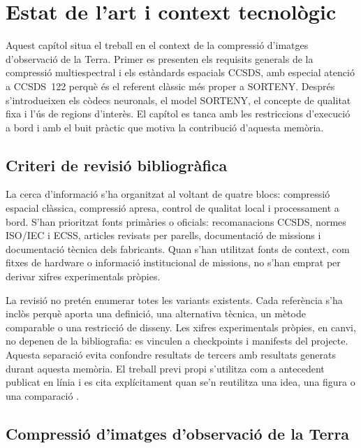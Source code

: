 \chapter{Estat de l'art i context tecnològic}\label{ch:estat_art}
\fancyhead[LO]{\slshape \textsf{\nouppercase \rightmark}}

Aquest capítol situa el treball en el context de la compressió d'imatges
d'observació de la Terra. Primer es presenten els requisits generals de la
compressió multiespectral i els estàndards espacials CCSDS, amb especial
atenció a CCSDS~122 perquè és el referent clàssic més proper a SORTENY.
Després s'introdueixen els còdecs neuronals, el model SORTENY, el concepte de
qualitat fixa i l'ús de regions d'interès. El capítol es tanca amb les
restriccions d'execució a bord i amb el buit pràctic que motiva la contribució
d'aquesta memòria.

\section{Criteri de revisió bibliogràfica}\label{sec:cerca}

La cerca d'informació s'ha organitzat al voltant de quatre blocs: compressió
espacial clàssica, compressió apresa, control de qualitat local i processament
a bord. S'han prioritzat fonts primàries o oficials: recomanacions CCSDS,
normes ISO/IEC i ECSS, articles revisats per parells, documentació de missions
i documentació tècnica dels fabricants. Quan s'han utilitzat fonts de context,
com fitxes de hardware o informació institucional de missions, no s'han emprat
per derivar xifres experimentals pròpies.

La revisió no pretén enumerar totes les variants existents. Cada referència
s'ha inclòs perquè aporta una definició, una alternativa tècnica, un mètode
comparable o una restricció de disseny. Les xifres experimentals pròpies, en
canvi, no depenen de la bibliografia: es vinculen a checkpoints i manifests del
projecte. Aquesta separació evita confondre resultats de tercers amb resultats
generats durant aquesta memòria. El treball previ propi s'utilitza com a
antecedent publicat en línia i es cita explícitament quan se'n reutilitza una
idea, una figura o una comparació \cite{anez2026treball}.

\section{Compressió d'imatges d'observació de la Terra}\label{sec:compressio_remota}

